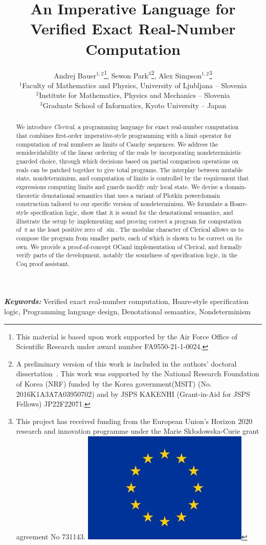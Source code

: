 \documentclass{article}
\title{An Imperative Language for Verified Exact Real-Number Computation}
\author{
Andrej Bauer${}^{1,2}$\thanks{This material is based upon work supported by the Air Force Office of Scientific Research under award number FA9550-21-1-0024.},
Sewon Park$^3$\thanks{A preliminary version of this work is included in the authors' doctoral dissertation~\cite{sewonphd}. 
This work was supported by the National Research Foundation of Korea (NRF) funded by the Korea government(MSIT) (No. 2016K1A3A7A03950702) and by JSPS KAKENHI (Grant-in-Aid for JSPS Fellows) JP22F22071.},
Alex Simpson${}^{1,2}$\thanks{This project has received funding from the  European Union's  Horizon  2020  research  
and innovation programme under the Marie Sk{\l}odowska-Curie grant  agreement No 731143.\newline
\includegraphics[scale=0.07]{eu-flag-300x201.jpg}}\\
\small $^{1}$Faculty of Mathematics and Physics, University of Ljubljana -- Slovenia\\
\small $^{2}$Institute for Mathematics, Physics and Mechanics -- Slovenia\\
\small $^{3}$Graduate School of Informatics, Kyoto University -- Japan
} %
\date{}
\begin{document}
\maketitle

\begin{abstract}

We introduce \emph{Clerical}, a programming language for exact real-number computation that combines first-order imperative-style programming with
a limit operator for computation of real numbers as limits of Cauchy sequences.
%
We address the semidecidability of the linear ordering of the reals by incorporating nondeterministic guarded choice, through which decisions based on partial comparison operations on reals can be patched together to give total programs.
%
The interplay between mutable state, nondeterminism, and computation of limits is controlled by the requirement that expressions computing limits and guards modify only local state.
%
We devise a domain-theoretic denotational semantics that uses a variant of Plotkin powerdomain construction tailored to our specific version of nondeterminism.
%
We formulate a Hoare-style specification logic, show that it is sound for the denotational semantics,
and illustrate the setup by implementing and proving correct a program for computation of~$\pi$ as the least positive zero of~$\sin$. The modular character of Clerical allows us to compose the program from smaller parts, each of which is shown to be correct on its own.
%
We provide a proof-of-concept OCaml implementation of Clerical, and formally verify parts of the development, notably the soundness of specification logic, in the Coq proof assistant.
%
\end{abstract}

\bigskip

\noindent
\textbf{\textit{Keywords:}}
Verified exact real-number computation, Hoare-style specification logic, Programming language design, Denotational semantics, Nondeterminism

\clearpage

\tableofcontents












\end{document}
